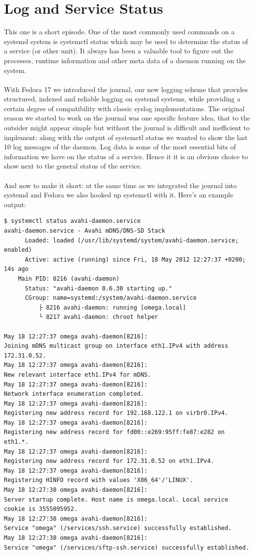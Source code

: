\documentclass[titlepage]{article}
\begin{document}
\section{Log and Service Status}
This one is a short episode. One of the most commonly used commands on a systemd system is systemctl status which may be used to determine the status of a service (or other unit). It always has been a valuable tool to figure out the processes, runtime information and other meta data of a daemon running on the system.
\\
\\
With Fedora 17 we introduced the journal, our new logging scheme that provides structured, indexed and reliable logging on systemd systems, while providing a certain degree of compatibility with classic syslog implementations. The original reason we started to work on the journal was one specific feature idea, that to the outsider might appear simple but without the journal is difficult and inefficient to implement: along with the output of systemctl status we wanted to show the last 10 log messages of the daemon. Log data is some of the most essential bits of information we have on the status of a service. Hence it it is an obvious choice to show next to the general status of the service.
\\
\\
And now to make it short: at the same time as we integrated the journal into systemd and Fedora we also hooked up systemctl with it. Here's an example output:
\begin{lstlisting}
$ systemctl status avahi-daemon.service
avahi-daemon.service - Avahi mDNS/DNS-SD Stack
      Loaded: loaded (/usr/lib/systemd/system/avahi-daemon.service; enabled)
      Active: active (running) since Fri, 18 May 2012 12:27:37 +0200; 14s ago
    Main PID: 8216 (avahi-daemon)
      Status: "avahi-daemon 0.6.30 starting up."
      CGroup: name=systemd:/system/avahi-daemon.service
          ├ 8216 avahi-daemon: running [omega.local]
          └ 8217 avahi-daemon: chroot helper

May 18 12:27:37 omega avahi-daemon[8216]: 
Joining mDNS multicast group on interface eth1.IPv4 with address 172.31.0.52.
May 18 12:27:37 omega avahi-daemon[8216]: 
New relevant interface eth1.IPv4 for mDNS.
May 18 12:27:37 omega avahi-daemon[8216]: 
Network interface enumeration completed.
May 18 12:27:37 omega avahi-daemon[8216]: 
Registering new address record for 192.168.122.1 on virbr0.IPv4.
May 18 12:27:37 omega avahi-daemon[8216]: 
Registering new address record for fd00::e269:95ff:fe87:e282 on eth1.*.
May 18 12:27:37 omega avahi-daemon[8216]: 
Registering new address record for 172.31.0.52 on eth1.IPv4.
May 18 12:27:37 omega avahi-daemon[8216]: 
Registering HINFO record with values 'X86_64'/'LINUX'.
May 18 12:27:38 omega avahi-daemon[8216]: 
Server startup complete. Host name is omega.local. Local service cookie is 3555095952.
May 18 12:27:38 omega avahi-daemon[8216]: 
Service "omega" (/services/ssh.service) successfully established.
May 18 12:27:38 omega avahi-daemon[8216]: 
Service "omega" (/services/sftp-ssh.service) successfully established.
\end{lstlisting}
\end{document}
